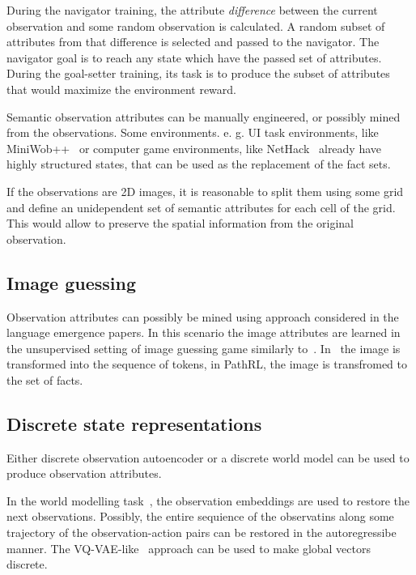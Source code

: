 \documentclass[acmsmall, nonacm]{acmart}
\begin{document}
During the navigator training, the attribute \textit{difference} between the current observation and some random observation is calculated. A random subset of attributes from that difference is selected and passed to the navigator. The navigator goal is to reach any state which have the passed set of attributes. During the goal-setter training, its task is to produce the subset of attributes that would maximize the environment reward.

Semantic observation attributes can be manually engineered, or possibly mined from the observations. Some environments. e. g. UI task environments, like MiniWob++~\cite{liu2018reinforcement} or computer game environments, like NetHack~\cite{kuttler_nethack_2020} already have highly structured states, that can be used as the replacement of the fact sets.

If the observations are 2D images, it is reasonable to split them using some grid and define an unidependent set of semantic attributes for each cell of the grid. This would allow to preserve the spatial information from the original observation.

\subsection{Image guessing}

Observation attributes can possibly be mined using approach considered in the language emergence papers. In this scenario the image attributes are learned in the unsupervised setting of image guessing game similarly to~\citet{Havrylov2017EmergenceOL}. In~\citet{Havrylov2017EmergenceOL} the image is transformed into the sequence of tokens, in PathRL, the image is transfromed to the set of facts.

\subsection{Discrete state representations}

Either discrete observation autoencoder or a discrete world model can be used to produce observation attributes.

In the world modelling task~\cite{NEURIPS2018_2de5d166}, the observation embeddings are used to restore the next observations. Possibly, the entire sequience of the observatins along some trajectory of the observation-action pairs can be restored in the autoregressibe manner. The VQ-VAE-like~\cite{van2017neural} approach can be used to make global vectors discrete.
\end{document}
